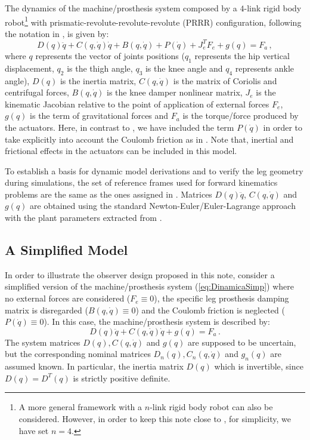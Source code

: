 \documentclass[letterpaper, 10 pt, journal, twocolumn]{IEEEtran}  %
\theoremstyle{plain}
\theoremstyle{definition}
\theoremstyle{remark}
\begin{document}
The dynamics of the machine/prosthesis system composed by a $4$-link rigid body robot\footnote{A more general framework with a $n$-link rigid body robot can also be considered. However, in order to keep this note close to \cite{Richter2015}, for simplicity, we have set $n=4$.}  with prismatic-revolute-revolute-revolute (PRRR) configuration, following the notation in \cite{Richter2015}, is given by:
%
\begin{equation}
D(q)\ddot{q} + C(q,\dot{q})\dot{q}+B(q,\dot{q}) + P(\dot{q}) + J_e^T F_e+g(q) = F_a\,,
\label{eq:Dinamica}
\end{equation}
%
where  $q$ represents the vector of joints positions ($q_1$ represents the hip vertical displacement, $q_2$ is the thigh angle, $q_3$ is the knee angle and $q_4$ represents ankle angle), $D(q)$ is the inertia matrix, $C(q,\dot{q})$ is the matrix of Coriolis and centrifugal forces, $B(q,\dot{q})$ is the knee  damper nonlinear matrix, $J_e$ is the kinematic Jacobian relative to the point of application of external forces $F_e$, $g(q)$ is the term of gravitational forces and $F_a$ is the torque/force produced by the actuators. Here, in contrast to \cite{Richter2015}, we have included the term  $P(\dot{q})$ in order to take explicitly into account the Coulomb friction as in \cite{LeeKhalil2015}. Note that, inertial and frictional effects in the actuators can be included in this model. 

To establish a basis for dynamic model derivations and to verify the leg geometry during simulations, the set of reference frames used for forward kinematics problems are the same as the ones assigned in \cite{Richter2015}. Matrices $D(q)\ddot{q}$, $C(q,\dot{q})$ and $g(q)$ are obtained using the standard Newton-Euler/Euler-Lagrange approach with the plant parameters  extracted from \cite{Richter2015}.

\subsection{A Simplified Model}


In order to illustrate the observer design proposed in this note, consider a simplified version of the machine/prosthesis system (\ref{eq:DinamicaSimp}) where no external forces are considered ($F_e \equiv 0$), the specific leg prosthesis damping matrix is disregarded ($B(q,\dot{q}) \equiv 0$) and the  Coulomb friction is neglected  ($P(\dot{q}) \equiv 0$). In this case, the machine/prosthesis system is described by:
%
\begin{equation}
D(q)\ddot{q} + C(q,\dot{q})\dot{q}+g(q) = F_a\,.
\label{eq:DinamicaSimp}
\end{equation}
%
The system matrices $D(q), C(q,\dot{q})$ and $g(q)$ are supposed to be uncertain, but the corresponding nominal matrices  $D_n(q), C_n(q,\dot{q})$ and $g_n(q)$ are assumed known. In particular, the inertia matrix $D(q)$ which is invertible, since $D(q)=D^T(q)$ is strictly positive definite.
\end{document}
